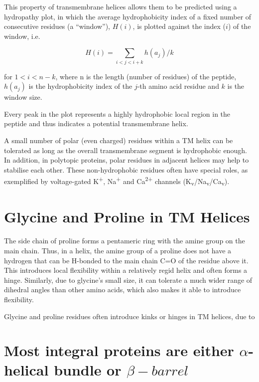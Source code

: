 \documentclass[
]{article}
\begin{document}
This property of transmembrane helices allows them to be predicted using a hydropathy plot, in which the average hydrophobicity index of a fixed number of consecutive residues (a ``window''), \(H(i)\), is plotted against the index (\(i\)) of the window, i.e.

\[H(i) = \sum_{i<j<i+k}h(a_j)/k\]

for \(1 < i < n - k\), where n is the length (number of residues) of the peptide, \(h(a_j)\) is the hydrophobicity index of the \(j\)-th amino acid residue and \(k\) is the window size.

Every peak in the plot represents a highly hydrophobic local region in the peptide and thus indicates a potential transmembrane helix.

A small number of polar (even charged) residues within a TM helix can be tolerated as long as the overall transmembrane segment is hydrophobic enough. In addition, in polytopic proteins, polar residues in adjacent helices may help to stabilise each other. These non-hydrophobic residues often have special roles, as exemplified by voltage-gated K\textsuperscript{+}, Na\textsuperscript{+} and Ca\textsuperscript{2+} channels (K\textsubscript{v}/Na\textsubscript{v}/Ca\textsubscript{v}).

\hypertarget{glycine-and-proline-in-tm-helices}{%
\section{Glycine and Proline in TM Helices}\label{glycine-and-proline-in-tm-helices}}

The side chain of proline forms a pentameric ring with the amine group on the main chain. Thus, in a helix, the amine group of a proline does not have a hydrogen that can be H-bonded to the main chain C=O of the residue above it. This introduces local flexibility within a relatively regid helix and often forms a hinge. Similarly, due to glycine's small size, it can tolerate a much wider range of dihedral angles than other amino acids, which also makes it able to introduce flexibility.

Glycine and proline residues often introduce kinks or hinges in TM helices, due to

\hypertarget{most-integral-proteins-are-either-alpha-helical-bundle-or-beta-barrel}{%
\section{\texorpdfstring{Most integral proteins are either \(\alpha\)-helical bundle or \(\beta-barrel\)}{Most integral proteins are either \textbackslash alpha-helical bundle or \textbackslash beta-barrel}}\label{most-integral-proteins-are-either-alpha-helical-bundle-or-beta-barrel}}
\end{document}
